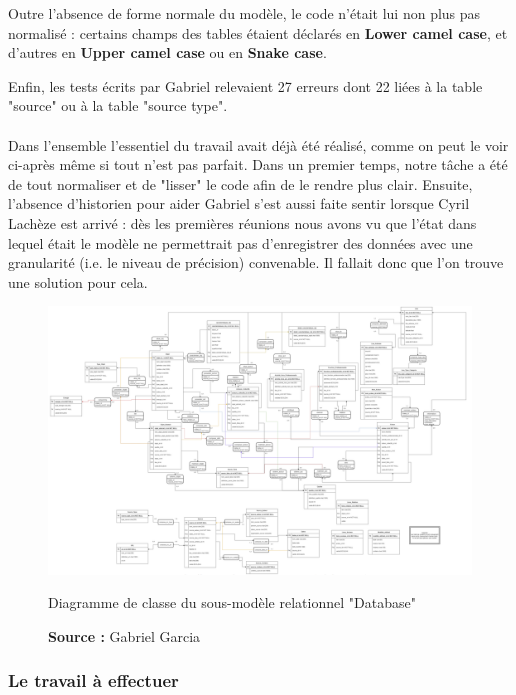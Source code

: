 Outre l'absence de forme normale du modèle, le code n'était lui non plus pas normalisé : certains champs des tables étaient déclarés en \textbf{Lower camel case}, et d'autres en \textbf{Upper camel case} ou en \textbf{Snake case}.

Enfin, les tests écrits par Gabriel relevaient 27 erreurs dont 22 liées à la table "source" ou à la table "source type".

\paragraph{} \hspace{10mm}
Dans l'ensemble l'essentiel du travail avait déjà été réalisé, comme on peut le voir ci-après même si tout n'est pas parfait. Dans un premier temps, notre tâche a été de tout normaliser et de "lisser" le code afin de le rendre plus clair. Ensuite, l'absence d'historien pour aider Gabriel s'est aussi faite sentir lorsque Cyril Lachèze est arrivé : dès les premières réunions nous avons vu que l'état dans lequel était le modèle ne permettrait pas d'enregistrer des données avec une granularité (i.e. le niveau de précision) convenable. Il fallait donc que l'on trouve une solution pour cela.

\begin{figure} [H]
    \centering
    \includegraphics[width=1\textwidth]{assets/web/diagramme_modele_database.png}
    \caption{Diagramme de classe du sous-modèle relationnel "Database"}
    \caption*{\textbf{Source :} Gabriel Garcia}
    \label{fig:diagrammeClasseDatabase}
\end{figure}

\subsubsection{Le travail à effectuer}
